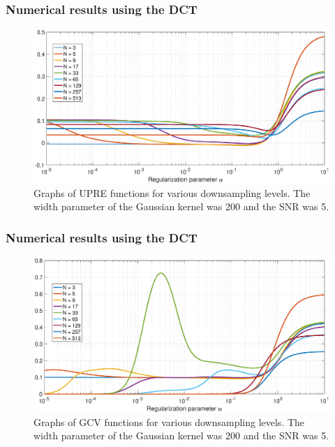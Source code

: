 \documentclass[t]{beamer}
\begin{document}
\begin{frame}
\frametitle{Numerical results using the DCT}
\begin{figure}
\centering
\includegraphics[scale=0.25]{Figures/UPRE_Vec.eps}
\caption{Graphs of UPRE functions for various downsampling levels. The width parameter of the Gaussian kernel was 200 and the SNR was 5.}
\end{figure}
\end{frame}

\begin{frame}
\frametitle{Numerical results using the DCT}
\begin{figure}
\centering
\includegraphics[scale=0.25]{Figures/GCV_Vec.eps}
\caption{Graphs of GCV functions for various downsampling levels. The width parameter of the Gaussian kernel was 200 and the SNR was 5.}
\end{figure}
\end{frame}
\end{document}
